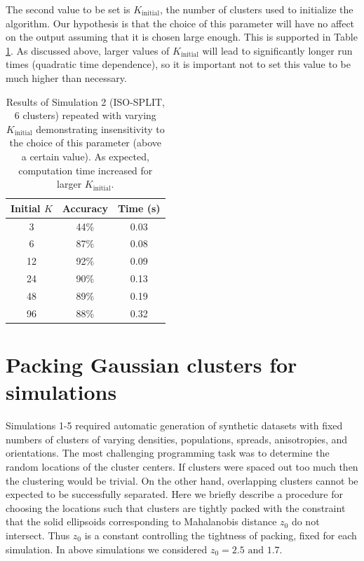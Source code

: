 \documentclass[10pt]{article}
\begin{document}
The second value to be set is $K_{\text{initial}}$, the number of clusters used to initialize the algorithm. Our hypothesis is that the choice of this parameter will have no affect on the output assuming that it is chosen large enough. This is supported in Table \ref{table:initial_K_dependence}. As discussed above, larger values of $K_{\text{initial}}$ will lead to significantly longer run times (quadratic time dependence), so it is important not to set this value to be much higher than necessary. 

\begin{table}[t]
  \centering
\begin{tabular}{c|c|c|}
	\textbf{Initial $K$} & \textbf{Accuracy} & \textbf{Time (s)} \\
	\hline
	3 & 44\% & 0.03 \\
6 & 87\% & 0.08 \\
12 & 92\% & 0.09 \\
24 & 90\% & 0.13 \\
48 & 89\% & 0.19 \\
96 & 88\% & 0.32 \\
\end{tabular}
\caption{
\label{table:initial_K_dependence}
Results of Simulation 2 (ISO-SPLIT, 6 clusters) repeated with varying $K_\text{initial}$ demonstrating insensitivity to the choice of this parameter (above a certain value). As expected, computation time increased for larger $K_\text{initial}$.
}
\end{table}

\section {Packing Gaussian clusters for simulations}
\label{appendixPacking}

Simulations 1-5 required automatic generation of synthetic datasets with fixed numbers of clusters of varying densities, populations, spreads, anisotropies, and orientations. The most challenging programming task was to determine the random locations of the cluster centers. If clusters were spaced out too much then the clustering would be trivial. On the other hand, overlapping clusters cannot be expected to be successfully separated. Here we briefly describe a procedure for choosing the locations such that clusters are tightly packed with the constraint that the solid ellipsoids corresponding to Mahalanobis distance $z_0$ do not intersect. Thus $z_0$ is a constant controlling the tightness of packing, fixed for each simulation. In above simulations we considered $z_0=2.5\text{ and }1.7$.
\end{document}

